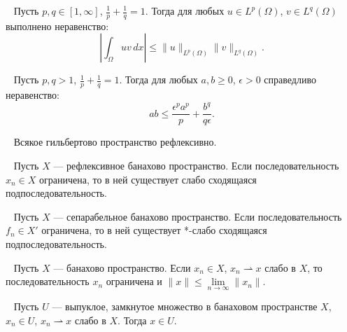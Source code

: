 \begin{lemma}
    \label{lemma:hoelder}~\cite[с.~35]{Zeidler1990b}
    Пусть $p, q \in [1, \infty]$, $\frac{1}{p} + \frac{1}{q} = 1$.
    Тогда для любых $u \in L^p(\Omega)$, $v \in L^q(\Omega)$
    выполнено неравенство:
    \[
        \left| \int_\Omega uv \, dx \right|
        \le \|u\|_{L^p(\Omega)} \|v\|_{L^q(\Omega)}.
    \]
\end{lemma}

\begin{lemma}
    \label{lemma:young}~\cite[с.~38]{Zeidler1990a}
    Пусть $p, q > 1$, $\frac{1}{p} + \frac{1}{q} = 1$.
    Тогда для любых $a, b \ge 0$, $\epsilon > 0$
    справедливо неравенство:
    \[
        ab \le \frac{\epsilon^p a^p}{p} + \frac{b^q}{q\epsilon}.
    \]
\end{lemma}

\begin{lemma}
    \label{lemma:reflexive}~\cite[с.~254]{Zeidler1990a}
    Всякое гильбертово пространство рефлексивно.
\end{lemma}

\begin{lemma}
    \label{lemma:reflexive_weak}~\cite[с.~255]{Zeidler1990a}
    Пусть $X$ — рефлексивное банахово пространство.
    Если последовательность $x_n \in X$ ограничена,
    то в ней существует слабо сходящаяся подпоследовательность.
\end{lemma}

\begin{lemma}
    \label{lemma:separable_star_weak}~\cite[260]{Zeidler1990a}
    Пусть $X$ — сепарабельное банахово пространство.
    Если последовательность $f_n \in X'$ ограничена,
    то в ней существует *-слабо сходящаяся подпоследовательность.
\end{lemma}

\begin{lemma}
    \label{lemma:weak_limit}~\cite[258]{Zeidler1990a}
    Пусть $X$ — банахово пространство.
    Если $x_n \in X$, $x_n \rightharpoonup x$ слабо в $X$,
    то последовательность $x_n$ ограничена и
    $\|x\| \le \lim\limits_{n \to \infty} \|x_n\|$.
\end{lemma}

\begin{lemma}
    \label{lemma:convex_closed}~\cite[47]{Troeltzsch2010}
    Пусть $U$ — выпуклое, замкнутое множество в банаховом пространстве
    $X$, $x_n \in U$, $x_n \rightharpoonup x$ слабо в $X$.
    Тогда $x \in U$.
\end{lemma}

